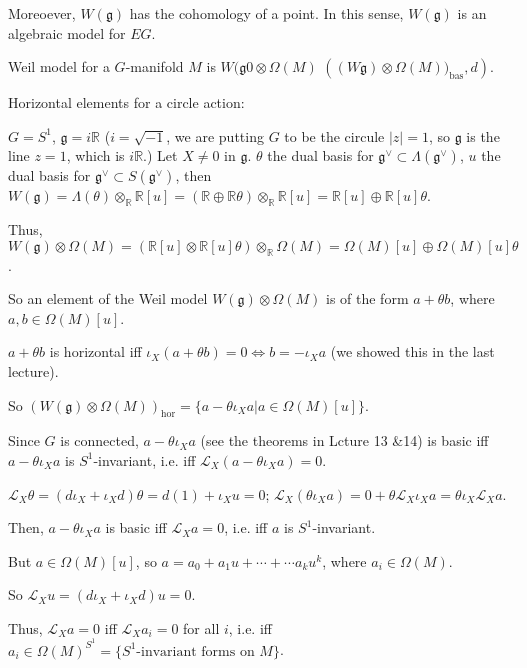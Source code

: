 \documentclass{article}
\theoremstyle{mystyle}
\theoremstyle{remark}
\numberwithin{equation}{section}
\begin{document}
Moreoever, $W(\mathfrak{g})$ has the cohomology of a point. In this sense, $W(\mathfrak{g})$ is an algebraic model for $EG$. 

Weil model for a $G$-manifold $M$ is $W(\mathfrak{g}0\otimes \Omega(M)$ $\left((W\mathfrak{g})\otimes \Omega(M))_{\text{bas}},d\right)$.

Horizontal elements for a circle action:


$G = S^1$, $\mathfrak{g} = i \mathbb{R}$ ($i=\sqrt{-1}$, we are putting $G$ to be the circule $|z|=1$, so $\mathfrak{g}$ is the line $z=1$, which is $i\mathbb{R}$.) Let $X\neq 0$ in $\mathfrak{g}$. $\theta$ the dual basis for $\mathfrak{g}^\vee \subset \Lambda(\mathfrak{g}^\vee)$, $u$ the dual basis for $\mathfrak{g}^\vee\subset S(\mathfrak{g}^\vee)$, then $W(\mathfrak{g}) = \Lambda(\theta)\otimes_{\mathbb{R}}\mathbb{R}[u] = (\mathbb{R}\oplus \mathbb{R}\theta)\otimes_{\mathbb{R}} \mathbb{R}[u]
= 
\mathbb{R}[u]\oplus \mathbb{R}[u]\theta$. 

Thus, $W(\mathfrak{g})\otimes \Omega(M)
= 
\left(\mathbb{R}[u]\otimes \mathbb{R}[u]\theta\right)\otimes_{\mathbb{R}} \Omega(M)
=
\Omega(M)[u]\oplus \Omega(M)[u]\theta$.

So an element of the Weil model $W(\mathfrak{g})\otimes \Omega(M)$ is of the form $a+\theta b$, where $a,b\in \Omega(M)[u]$. 

$a+\theta b$ is horizontal iff $\iota_X(a+\theta b) =0 \Leftrightarrow b = -\iota_Xa$ (we showed this in the last lecture). 

So $\left(W(\mathfrak{g})\otimes \Omega(M)\right)_{\text{hor}} = \{ a-\theta\iota_Xa|a\in \Omega(M)[u]\}$. 

Since $G$ is connected, $a-\theta\iota_Xa$
(see the theorems in Lcture 13 \&14) is basic iff $a-\theta\iota_Xa$ is $S^1$-invariant, i.e. iff $\mathcal{L}_X (a-\theta\iota_Xa)=0$. 

$\mathcal{L}_X\theta =  (d\iota_X + \iota_Xd)  \theta = d(1)+\iota_Xu = 0$; $\mathcal{L}_X(\theta\iota_Xa) = 0 + \theta \mathcal{L}_X \iota_Xa  = \theta \iota_X\mathcal{L}_Xa$.

Then, $a-\theta \iota_Xa$ is basic iff $\mathcal{L}_Xa=0$, i.e. iff $a$ is $S^1$-invariant.

But $a\in \Omega(M)[u]$, so $a = a_0+a_1u+\cdots +\cdots a_ku^k$, where $a_i \in \Omega(M)$. 

So $\mathcal{L}_Xu = (d\iota_X + \iota_X d) u
=0$.

Thus, $\mathcal{L}_Xa=0$ iff $\mathcal{L}_Xa_i=0$ for all $i$, i.e. iff $a_i\in \Omega(M)^{S^1} = \{S^1\text{-invariant forms on }M\}$.
\end{document}
